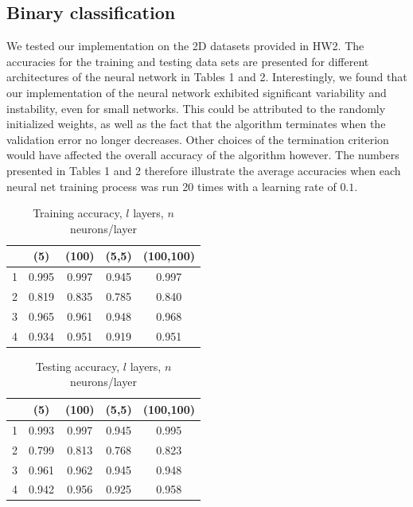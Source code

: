 \documentclass{article}
\begin{document}
\subsection{Binary classification}
We tested our implementation on the 2D datasets provided in HW2. The accuracies for the training and testing data sets are presented for different architectures of the neural network in Tables 1 and 2. Interestingly, we found that our implementation of the neural network exhibited significant variability and instability, even for small networks. This could be attributed to the randomly initialized weights, as well as the fact that the algorithm terminates when the validation error no longer decreases. Other choices of the termination criterion would have affected the overall accuracy of the algorithm however. The numbers presented in Tables 1 and 2 therefore illustrate the average accuracies when each neural net training process was run 20 times with a learning rate of $0.1$.

\begin{table}
  \begin{center}
    \begin{tabular}{ | c | c | c | c | c | }
      \hline
          & (5) & (100) & (5,5) & (100,100) \\ \hline
      1   & 0.995      & 0.997        & 0.945      & 0.997        \\ \hline
      2   & 0.819      & 0.835        & 0.785      & 0.840        \\ \hline
      3   & 0.965      & 0.961        & 0.948      & 0.968        \\ \hline
      4   & 0.934      & 0.951        & 0.919      & 0.951        \\ \hline
    \end{tabular}
  \end{center}
  \caption{Training accuracy, $l$ layers, $n$ neurons/layer}
\end{table}

\begin{table}
  \begin{center}
    \begin{tabular}{ | c | c | c | c | c | }
      \hline
          & (5)   & (100) & (5,5) & (100,100) \\ \hline
      1   & 0.993      & 0.997        & 0.945      & 0.995        \\ \hline
      2   & 0.799      & 0.813        & 0.768      & 0.823        \\ \hline
      3   & 0.961      & 0.962        & 0.945      & 0.948        \\ \hline
      4   & 0.942      & 0.956        & 0.925      & 0.958        \\ \hline
    \end{tabular}
  \end{center}
  \caption{Testing accuracy, $l$ layers, $n$ neurons/layer}
\end{table}
\end{document}
